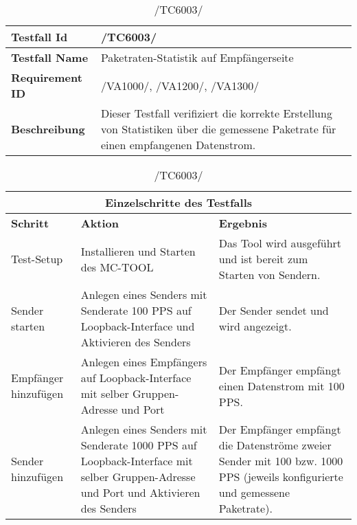     \begin{table}[h]
        \caption{/TC6003/}
        \label{tab:TC6003}
        \begin{center}
            \begin{tabular}{|p{3.5cm}|p{12cm}|}
                \hline
                    \textbf{Testfall Id} & /TC6003/\\
                \hline
                    \textbf{Testfall Name} & Paketraten-Statistik auf
                    Empfängerseite\\
                \hline
                    \textbf{Requirement ID} & /VA1000/, /VA1200/, /VA1300/\\
                \hline
                    \textbf{Beschreibung} & Dieser Testfall verifiziert die
                    korrekte Erstellung von Statistiken über die
                    gemessene Paketrate für einen empfangenen Datenstrom.\\
                \hline
            \end{tabular}
            \begin{tabular}{|p{2.5cm}|p{5cm}|p{7.55cm}|}
                \multicolumn{3}{|c|}{\textbf{Einzelschritte des Testfalls}} \\
                \hline
                    \textbf{Schritt} & \textbf{Aktion} & \textbf{Ergebnis}\\
                \hline
                    Test-Setup & Installieren und Starten des MC-TOOL & Das Tool
                    wird ausgeführt und ist bereit zum Starten von Sendern. \\
                \hline
                    Sender starten & Anlegen eines Senders mit Senderate 100
                    PPS auf Loopback-Interface und Aktivieren des Senders & Der
                    Sender sendet und wird angezeigt.\\
                \hline
                    Empfänger hinzufügen & Anlegen eines Empfängers
                    auf Loopback-Interface mit selber Gruppen-Adresse und Port &
                    Der Empfänger empfängt einen Datenstrom mit 100 PPS.\\
                \hline
                    Sender hinzufügen & Anlegen eines Senders mit Senderate
                    1000 PPS auf Loopback-Interface mit selber Gruppen-Adresse
                    und Port und Aktivieren des Senders & Der Empfänger
                    empfängt die Datenströme zweier Sender mit 100 bzw. 1000
                    PPS (jeweils konfigurierte und gemessene Paketrate).\\

\end{tabular}
\end{center}
\end{table}
